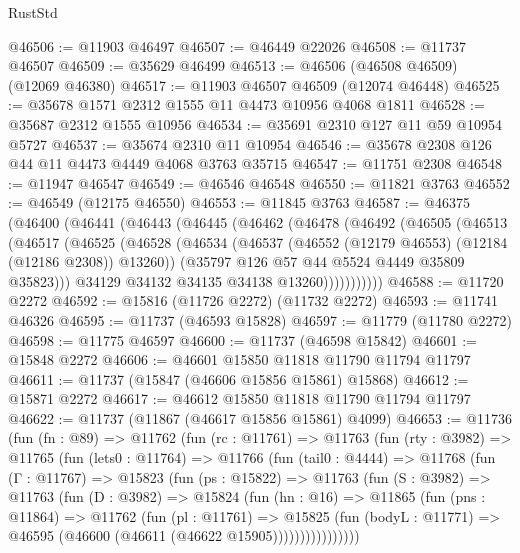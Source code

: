 \begin{lexlean}{RustStd}
\begin{coremodule}
@46506 := @11903 @46497
@46507 := @46449 @22026
@46508 := @11737 @46507
@46509 := @35629 @46499
@46513 := @46506 (@46508 @46509) (@12069 @46380)
@46517 := @11903 @46507 @46509 (@12074 @46448)
@46525 := @35678 @1571 @2312 @1555 @11 @4473 @10956 @4068 @1811
@46528 := @35687 @2312 @1555 @10956
@46534 := @35691 @2310 @127 @11 @59 @10954 @5727
@46537 := @35674 @2310 @11 @10954
@46546 := @35678 @2308 @126 @44 @11 @4473 @4449 @4068 @3763 @35715
@46547 := @11751 @2308
@46548 := @11947 @46547
@46549 := @46546 @46548
@46550 := @11821 @3763
@46552 := @46549 (@12175 @46550)
@46553 := @11845 @3763
@46587 := @46375
    (@46400
      (@46441
        (@46443
          (@46445
            (@46462
              (@46478
                (@46492
                  (@46505
                    (@46513
                      (@46517
                        (@46525
                          (@46528
                            (@46534
                              (@46537 (@46552 (@12179 @46553) (@12184 (@12186 @2308)) @13260))
                              (@35797 @126 @57 @44 @5524 @4449 @35809 @35823)))
                          @34129
                          @34132
                          @34135
                          @34138
                          @13260)))))))))))
@46588 := @11720 @2272
@46592 := @15816 (@11726 @2272) (@11732 @2272)
@46593 := @11741 @46326
@46595 := @11737 (@46593 @15828)
@46597 := @11779 (@11780 @2272)
@46598 := @11775 @46597
@46600 := @11737 (@46598 @15842)
@46601 := @15848 @2272
@46606 := @46601 @15850 @11818 @11790 @11794 @11797
@46611 := @11737 (@15847 (@46606 @15856 @15861) @15868)
@46612 := @15871 @2272
@46617 := @46612 @15850 @11818 @11790 @11794 @11797
@46622 := @11737 (@11867 (@46617 @15856 @15861) @4099)
@46653 := @11736
    (fun (fn : @89) =>
    @11762
      (fun (rc : @11761) =>
      @11763
        (fun (rty : @3982) =>
        @11765
          (fun (lets0 : @11764) =>
          @11766
            (fun (tail0 : @4444) =>
            @11768
              (fun (Γ : @11767) =>
              @15823
                (fun (ps : @15822) =>
                @11763
                  (fun (S : @3982) =>
                  @11763
                    (fun (D : @3982) =>
                    @15824
                      (fun (hn : @16) =>
                      @11865
                        (fun (pns : @11864) =>
                        @11762
                          (fun (pl : @11761) =>
                          @15825
                            (fun (bodyL : @11771) =>
                            @46595 (@46600 (@46611 (@46622 @15905))))))))))))))))

\end{coremodule}
\end{lexlean}
